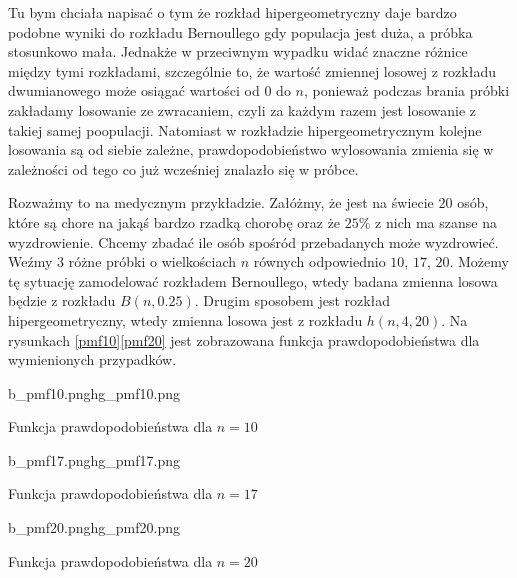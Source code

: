 Tu bym chciała napisać o tym że rozkład hipergeometryczny daje bardzo podobne wyniki do rozkładu Bernoullego gdy populacja jest duża, a  próbka stosunkowo mała. Jednakże w przeciwnym wypadku widać znaczne różnice między tymi rozkładami, szczególnie to, że wartość zmiennej losowej z rozkładu dwumianowego może osiągać wartości od $0$ do $n$, ponieważ podczas brania próbki zakładamy losowanie ze zwracaniem, czyli za każdym razem jest losowanie z takiej samej poopulacji. Natomiast w rozkładzie hipergeometrycznym kolejne losowania są od siebie zależne, prawdopodobieństwo wylosowania zmienia się w zależności od tego co już wcześniej znalazło się w próbce.

Rozważmy to na medycznym przykładzie. Załóżmy, że jest na świecie $20$ osób, które są chore na jakąś bardzo rzadką chorobę oraz że $25\%$ z nich ma szanse na wyzdrowienie. Chcemy zbadać ile osób spośród przebadanych może wyzdrowieć. Weźmy $3$ różne próbki o wielkościach $n$ równych odpowiednio $10$, $17$, $20$. Możemy tę sytuację zamodelować rozkładem Bernoullego, wtedy badana zmienna losowa będzie z rozkładu $B(n,0.25)$. Drugim sposobem jest rozkład hipergeometryczny, wtedy zmienna losowa jest z rozkładu $h(n,4,20)$. Na rysunkach \ref{pmf10}\dywiz \ref{pmf20} jest zobrazowana funkcja prawdopodobieństwa dla wymienionych przypadków.

\begin{diagrams}{b_pmf10.png}{hg_pmf10.png}
\caption{Funkcja prawdopodobieństwa dla $n=10$}
\label{pmf10}
\end{diagrams}

\begin{diagrams}{b_pmf17.png}{hg_pmf17.png}
	\caption{Funkcja prawdopodobieństwa dla $n=17$}
	\label{pmf17}
\end{diagrams}

\begin{diagrams}{b_pmf20.png}{hg_pmf20.png}
	\caption{Funkcja prawdopodobieństwa dla $n=20$}
	\label{pmf20}
\end{diagrams}


